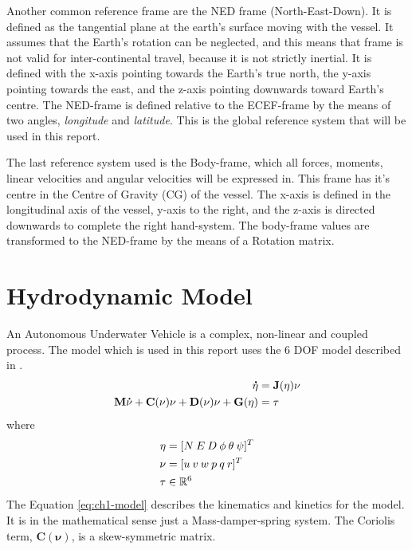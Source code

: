 	Another common reference frame are the NED frame (North-East-Down). It is defined as the tangential
plane at 
	the earth's surface moving with the vessel. It assumes that the Earth's rotation can be neglected, and this means 
	that frame is not valid for inter-continental travel, because it is not strictly inertial. It is defined with 
	the x-axis pointing towards the Earth's true north, the y-axis pointing towards the east, and the z-axis 
	pointing downwards toward Earth's centre. The NED-frame is defined relative to the ECEF-frame by the
means of 
	two angles, \textit{longitude} and \textit{latitude}. This is the global reference system that will be used 
	in this report. \cite{fossen}
	
	The last reference system used is the Body-frame, which all forces, moments, linear velocities and angular 
	velocities will be expressed in. This frame has it's centre in the Centre of Gravity (CG) of the
vessel. The 
	x-axis is defined in the longitudinal axis of the vessel, y-axis to the right, and the z-axis is
directed 
	downwards to complete the right hand-system. The body-frame values are transformed to the NED-frame by the means 
	of a Rotation matrix.
	
	
	

\section{Hydrodynamic Model}
	\label{sec:ch1-model}
	An Autonomous Underwater Vehicle is a complex, non-linear and coupled process. The model which is used in this
	report uses the 6 DOF model described in \cite{fossen}.
	\begin{equation}
	\label{eq:ch1-model}
		\begin{aligned}
			\mathbf{\dot{\eta}} &= \mathbf{J}(\mathbf{\eta}) \mathbf{\nu} \\
			\mathbf{M}\mathbf{\dot{\nu}} + \mathbf{C}(\mathbf{\nu})\mathbf{\nu} + \mathbf{D}(\mathbf{\nu})\mathbf{\nu} + \mathbf{G}(\mathbf{\eta}) &= \mathbf{\tau} \\
		\end{aligned}
	\end{equation}
	where 
	\begin{align*}
		\mathbf{\eta} &= [N \: E \: D \: \phi \: \theta \: \psi ]^T \\
		\mathbf{\nu}  &= [u \: v \: w \: p \: q \: r]^T \\
		\mathbf{\tau} & \in \mathbb{R}^6
	\end{align*}
	The Equation \eqref{eq:ch1-model} describes the kinematics and kinetics for the model. It is in the 
	mathematical sense just a Mass-damper-spring system. The Coriolis term, $\mathbf{C}(\mathbf{\nu})$,
is 
	a skew-symmetric matrix.
	
